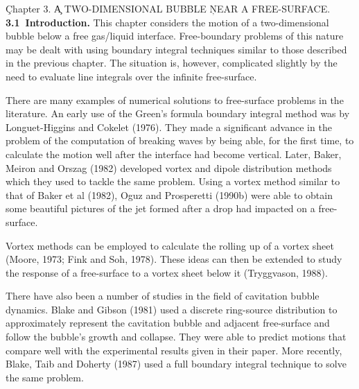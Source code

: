 \vbox{
\c{\bigrmb Chapter 3.}
\vskip 1cm
\c{\bigrm A TWO-DIMENSIONAL BUBBLE}
\c{\bigrm NEAR A FREE-SURFACE.}
\vskip 15pt
\hbox{\bf 3.1 Introduction.}
\vskip 5pt
}
This chapter considers the motion of a two-dimensional bubble below 
a free gas/liquid interface. Free-boundary problems of this nature may be
dealt with using boundary integral  techniques  similar  to  those
described in the previous chapter. The situation is, however,
complicated slightly 
by the need to evaluate line integrals over the infinite free-surface.

There are many examples of numerical solutions to free-surface problems
in the literature. An early use of the Green's formula boundary integral 
method was by Longuet-Higgins and Cokelet (1976). They made a significant
advance in the problem of the computation of breaking waves by being
able, for the first time, to calculate the motion well after the 
interface had become vertical. Later, Baker, Meiron and Orszag (1982)
developed vortex and dipole distribution methods which they used
to tackle the same problem.
Using a vortex method similar to that of Baker et al (1982), Oguz
and Prosperetti (1990b) were able to obtain some beautiful pictures
of the jet formed after a drop had impacted on a free-surface.

Vortex methods can be employed to calculate
the rolling up of a vortex sheet
(Moore, 1973; Fink and Soh, 1978). These ideas
can then be extended to study the response of a free-surface
to a vortex sheet below it (Tryggvason, 1988).

There have also been a number of studies in the field of
cavitation bubble dynamics. Blake and Gibson (1981) used a 
discrete ring-source distribution to approximately represent the
cavitation  bubble  and  adjacent  free-surface  and  follow  the
bubble's growth and collapse. They were able to
predict motions that compare well with the experimental results 
given in their paper. More recently, Blake, Taib and Doherty (1987) used
a full boundary integral technique to solve the same problem.

